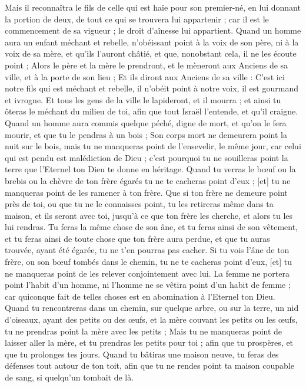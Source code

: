 \begin{multicols}{2}
Mais il reconnaîtra le fils de celle qui est haïe pour son premier-né, en lui donnant la portion de deux, de tout ce qui se trouvera lui appartenir ; car il est le commencement de sa vigueur ; le droit d'aînesse lui appartient.
Quand un homme aura un enfant méchant et rebelle, n'obéissant point à la voix de son père, ni à la voix de sa mère, et qu'ils l'auront châtié, et que, nonobstant cela, il ne les écoute point ;
Alors le père et la mère le prendront, et le mèneront aux Anciens de sa ville, et à la porte de son lieu ;
Et ils diront aux Anciens de sa ville : C'est ici notre fils qui est méchant et rebelle, il n'obéit point à notre voix, il est gourmand et ivrogne.
Et tous les gens de la ville le lapideront, et il mourra ; et ainsi tu ôteras le méchant du milieu de toi, afin que tout Israël l'entende, et qu'il craigne.
Quand un homme aura commis quelque péché, digne de mort, et qu'on le fera mourir, et que tu le pendras à un bois ;
Son corps mort ne demeurera point la nuit sur le bois, mais tu ne manqueras point de l'ensevelir, le même jour, car celui qui est pendu est malédiction de Dieu ; c'est pourquoi tu ne souilleras point la terre que l'Eternel ton Dieu te donne en héritage.
\VerseOne{}Quand tu verras le bœuf ou la brebis ou la chèvre de ton frère égarés tu ne te cacheras point d'eux ; [et] tu ne manqueras point de les ramener à ton frère.
Que si ton frère ne demeure point près de toi, ou que tu ne le connaisses point, tu les retireras même dans ta maison, et ils seront avec toi, jusqu'à ce que ton frère les cherche, et alors tu les lui rendras.
Tu feras la même chose de son âne, et tu feras ainsi de son vêtement, et tu feras ainsi de toute chose que ton frère aura perdue, et que tu auras trouvée, ayant été égarée, tu ne t'en pourras pas cacher.
Si tu vois l'âne de ton frère, ou son bœuf tombés dans le chemin, tu ne te cacheras point d'eux, [et] tu ne manqueras point de les relever conjointement avec lui.
La femme ne portera point l'habit d'un homme, ni l'homme ne se vêtira point d'un habit de femme ; car quiconque fait de telles choses est en abomination à l'Eternel ton Dieu.
Quand tu rencontreras dans un chemin, sur quelque arbre, ou sur la terre, un nid d'oiseaux, ayant des petits ou des œufs, et la mère couvant les petits ou les œufs, tu ne prendras point la mère avec les petits ;
Mais tu ne manqueras point de laisser aller la mère, et tu prendras les petits pour toi ; afin que tu prospères, et que tu prolonges tes jours.
Quand tu bâtiras une maison neuve, tu feras des défenses tout autour de ton toit, afin que tu ne rendes point ta maison coupable de sang, si quelqu'un tombait de là.

\end{multicols}

